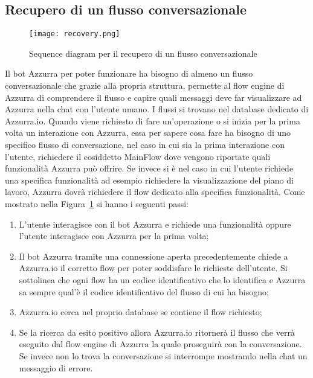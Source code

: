 \subsection{Recupero di un flusso conversazionale}
\begin{figure}[h]
	\begin{center}
		\texttt{[image: recovery.png]}
		\caption{Sequence diagram per il recupero di un flusso conversazionale}\label{fig:recovery}
	\end{center}
\end{figure}
Il bot Azzurra per poter funzionare ha bisogno di almeno un flusso conversazionale che grazie alla propria struttura, permette al flow engine di Azzurra di comprendere il flusso e capire quali messaggi deve far visualizzare ad Azzurra nella chat con l'utente umano. I flussi si trovano nel database dedicato di Azzurra.io. Quando viene richiesto di fare un’operazione o si inizia per la prima volta un interazione con Azzurra, essa per sapere cosa fare ha bisogno di uno specifico flusso di conversazione, nel caso in cui sia la prima interazione con l'utente, richiedere il cosiddetto MainFlow dove vengono riportate quali funzionalità Azzurra può offrire. Se invece si è nel caso in cui l'utente richiede una specifica funzionalità ad esempio richiedere la visualizzazione del piano di lavoro, Azzurra dovrà richiedere il flow dedicato alla specifica funzionalità.
Come mostrato nella Figura~\ref{fig:recovery} si hanno i seguenti passi:
\begin{enumerate}
\item L'utente interagisce con il bot Azzurra e richiede una funzionalità oppure l'utente interagisce con Azzurra per la prima volta;
\item Il bot Azzurra tramite una connessione aperta precedentemente chiede a Azzurra.io il corretto flow per poter soddisfare le richieste dell'utente. Si sottolinea che ogni flow ha un codice identificativo che lo identifica e Azzurra sa sempre qual'è il codice identificativo del flusso di cui ha bisogno;
\item Azzurra.io cerca nel proprio database se contiene il flow richiesto;
\item Se la ricerca da esito positivo allora Azzurra.io ritornerà il flusso che verrà eseguito dal flow engine di Azzurra la quale proseguirà con la conversazione. Se invece non lo trova la conversazione si interrompe mostrando nella chat un messaggio di errore.
\end{enumerate}

